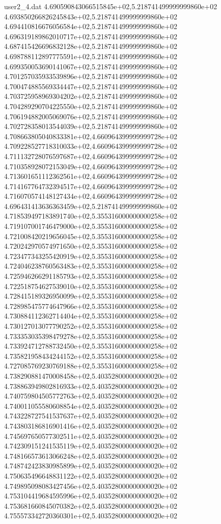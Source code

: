 \begin{filecontents}{user2_4.dat}
4.690590843066515845e+02,5.218741499999999860e+02
4.693850266826245843e+02,5.218741499999999860e+02
4.694410816676056584e+02,5.218741499999999860e+02
4.696319189862010717e+02,5.218741499999999860e+02
4.687415426696832128e+02,5.218741499999999860e+02
4.698788112897775591e+02,5.218741499999999860e+02
4.699350053690141067e+02,5.218741499999999860e+02
4.701257035933539896e+02,5.218741499999999860e+02
4.700474885569334447e+02,5.218741499999999860e+02
4.703725958969304202e+02,5.218741499999999860e+02
4.704289290704225550e+02,5.218741499999999860e+02
4.706194882005069076e+02,5.218741499999999860e+02
4.702728358013544039e+02,5.218741499999999860e+02
4.708663805040833381e+02,4.660964399999999728e+02
4.709228527718310033e+02,4.660964399999999728e+02
4.711132728076597687e+02,4.660964399999999728e+02
4.710358928072153049e+02,4.660964399999999728e+02
4.713601651112362561e+02,4.660964399999999728e+02
4.714167764732394517e+02,4.660964399999999728e+02
4.716070574148127434e+02,4.660964399999999728e+02
4.696431413636363459e+02,5.218741499999999860e+02
4.718539497183891740e+02,5.355316000000000258e+02
4.719107001746479000e+02,5.355316000000000258e+02
4.721008420219656045e+02,5.355316000000000258e+02
4.720242970574971650e+02,5.355316000000000258e+02
4.723477343255420919e+02,5.355316000000000258e+02
4.724046238760563483e+02,5.355316000000000258e+02
4.725946266291185793e+02,5.355316000000000258e+02
4.722518754627539010e+02,5.355316000000000258e+02
4.728415189326950099e+02,5.355316000000000258e+02
4.728985475774647966e+02,5.355316000000000258e+02
4.730884112362714404e+02,5.355316000000000258e+02
4.730127013077790252e+02,5.355316000000000258e+02
4.733353035398479278e+02,5.355316000000000258e+02
4.733924712788732450e+02,5.355316000000000258e+02
4.735821958434244152e+02,5.355316000000000258e+02
4.727085769230769188e+02,5.355316000000000258e+02
4.738290881470008458e+02,5.403528000000000020e+02
4.738863949802816933e+02,5.403528000000000020e+02
4.740759804505772763e+02,5.403528000000000020e+02
4.740011055580608854e+02,5.403528000000000020e+02
4.743228727541537637e+02,5.403528000000000020e+02
4.743803186816901416e+02,5.403528000000000020e+02
4.745697650577302511e+02,5.403528000000000020e+02
4.742309151241535119e+02,5.403528000000000020e+02
4.748166573613066248e+02,5.403528000000000020e+02
4.748742423830985899e+02,5.403528000000000020e+02
4.750635496648831122e+02,5.403528000000000020e+02
4.749895098083427456e+02,5.403528000000000020e+02
4.753104419684595996e+02,5.403528000000000020e+02
4.753681660845070382e+02,5.403528000000000020e+02
4.755573342720360301e+02,5.403528000000000020e+02

\end{filecontents}
